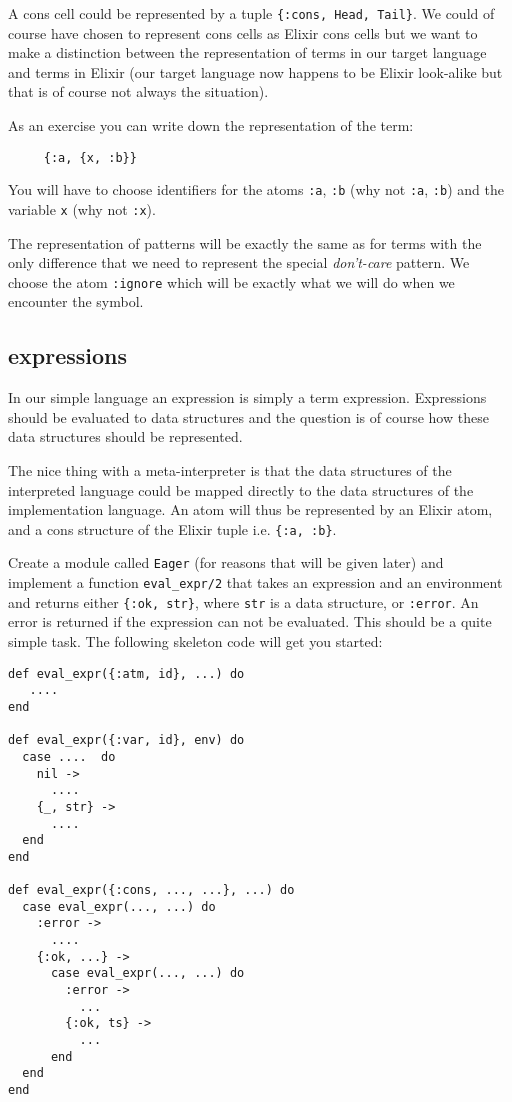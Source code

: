 \documentclass[a4paper,11pt]{article}
\begin{document}
A cons cell could be represented by a tuple {\tt \{:cons, Head,
  Tail\}}. We could of course have chosen to represent cons cells as
Elixir cons cells but we want to make a distinction between the
representation of terms in our target language and terms in Elixir (our
target language now happens to be Elixir look-alike but that is of
course not always the situation).

As an exercise you can write down the representation of the term:

\begin{verbatim}
     {:a, {x, :b}}
\end{verbatim}

You will have to choose identifiers for the atoms {\tt :a}, {\tt :b}
(why not {\tt :a}, {\tt :b}) and the variable {\tt x} (why
not {\tt :x}).

The representation of patterns will be exactly the same as for terms
with the only difference that we need to represent the special {\em
  don't-care} pattern. We choose the atom {\tt :ignore} which will be
exactly what we will do when we encounter the symbol.

\subsection{expressions}

In our simple language an expression is simply a term
expression. Expressions should be evaluated to data structures and the
question is of course how these data structures should be represented.

The nice thing with a meta-interpreter is that the data structures of
the interpreted language could be mapped directly to the data
structures of the implementation language. An atom will thus be
represented by an Elixir atom, and a cons structure of the Elixir tuple
 i.e. {\tt \{:a, :b\}}. 

Create a module called {\tt Eager} (for reasons that will be given
later) and implement a function {\tt eval\_expr/2} that takes an
expression and an environment and returns either {\tt \{:ok, str\}},
where {\tt str} is a data structure, or {\tt :error}. An error is
returned if the expression can not be evaluated. This should be a
quite simple task. The following skeleton code will get you started:

\begin{verbatim}
def eval_expr({:atm, id}, ...) do
   ....
end

def eval_expr({:var, id}, env) do
  case ....  do
    nil ->
      ....
    {_, str} ->
      ....
  end
end

def eval_expr({:cons, ..., ...}, ...) do
  case eval_expr(..., ...) do
    :error ->
      ....
    {:ok, ...} ->
      case eval_expr(..., ...) do
        :error ->
          ...
        {:ok, ts} -> 
          ...
      end
  end
end
\end{verbatim}
\end{document}
